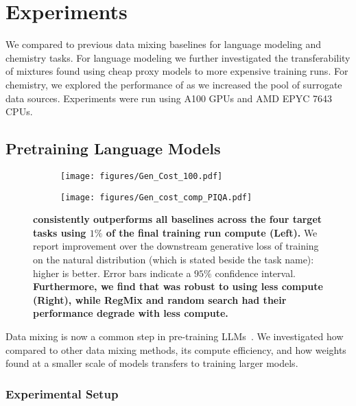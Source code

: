 \section{Experiments}
\label{sec:experiments}



We compared \method to previous data mixing baselines for language modeling and chemistry tasks. For language modeling we further investigated the transferability of mixtures found using cheap proxy models to more expensive training runs. For chemistry, we explored the performance of \method as we increased the pool of surrogate data sources.
Experiments were run using A100 GPUs and AMD EPYC 7643 CPUs.




\subsection{Pretraining Language Models}

\begin{figure*}[t!]
\centering
\begin{subfigure}
    \centering
    \texttt{[image: figures/Gen\_Cost\_100.pdf]}
    \label{fig:gen_loss_100}
\end{subfigure}%
\begin{subfigure}
    \centering
    \texttt{[image: figures/Gen\_cost\_comp\_PIQA.pdf]}
    \label{fig:piqa_cost_comp}
\end{subfigure}
\caption{\textbf{\method consistently outperforms all baselines across the four target tasks using $1\%$ of the final training run compute (Left).} We report improvement over the downstream generative loss of training on the natural distribution (which is stated beside the task name): higher is better. Error bars indicate a $95\%$ confidence interval. \textbf{Furthermore, we find that \method was robust to using less compute (Right), while RegMix and random search had their performance degrade with less compute.}}
\label{fig:llm_summary_res}
\end{figure*}

Data mixing is now a common step in pre-training LLMs~\citep{dubey2024llama,li2024datacomp}. We investigated how \method compared to other data mixing methods, its compute efficiency, and how weights found at a smaller scale of models transfers to training larger models.

\subsubsection{Experimental Setup}

